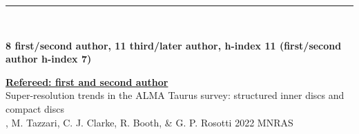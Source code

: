 \documentclass[10pt,preprint]{aastex}
\newcommand*{\xdash}[1][3em]{\rule[0.5ex]{#1}{0.7pt}}
\begin{document}


 \xdash[89.5ex] \\
\centerline{{\bf 8 first/second author, 11 third/later author, h-index 11 (first/second author h-index 7)}}

\noindent \underline{{\bf Refereed: first and second author}} \\
\noindent Super-resolution trends in the ALMA Taurus survey: structured inner discs and compact discs \\
, M. Tazzari, C. J. Clarke, R. Booth, \& G. P. Rosotti 2022 MNRAS 
\end{document}
